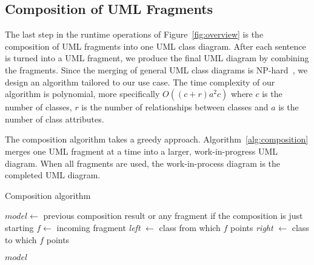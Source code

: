 \documentclass[sigconf]{acmart}
\begin{document}
\subsection{Composition of UML Fragments} \label{sec:composition}
The last step in the runtime operations of Figure~\ref{fig:overview} is the composition of UML fragments into one UML class diagram. After each sentence is turned into a UML fragment, we produce the final UML diagram by combining the fragments. Since the merging of general UML class diagrams is NP-hard~\cite{Rubin:2013merging}, we design an algorithm tailored to our use case. The time complexity of our algorithm is polynomial, more specifically $O((c+r)a^2c)$ where $c$ is the number of classes, $r$ is the number of relationships between classes and $a$ is the number of class attributes. 

The composition algorithm takes a greedy approach. Algorithm~\ref{alg:composition} merges one UML fragment at a time into a larger, work-in-progress UML diagram. When all fragments are used, the work-in-process diagram is the completed UML diagram.

\begin{algorithm}
\caption{Composition algorithm}\label{alg:composition}
\begin{algorithmic}[1]
\State $model \gets $ previous composition result or any fragment if the composition is just starting
\State $f \gets $ incoming fragment
        \Else {}
        \EndIf
    \Else {}
    \EndIf
{}
    \EndIf
    \State \textit{left} $\gets$ class from which $f$ points
    \State \textit{right} $\gets$ class to which $f$ points
    
    \EndIf
    
    \EndIf
    
    \Else {}
    \EndIf
\EndIf
\State \Return $model$
\end{algorithmic}
\end{algorithm}
\end{document}
